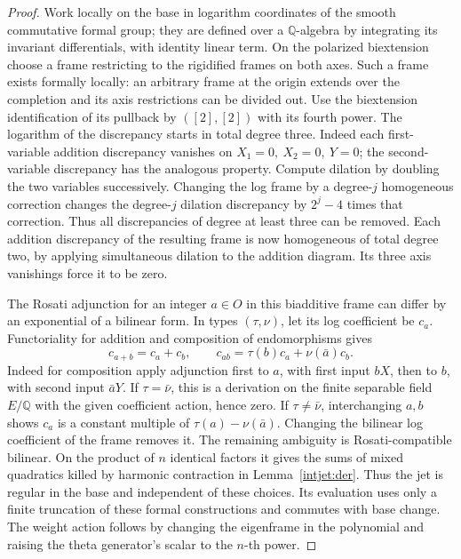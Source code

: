 \begin{proof}
Work locally on the base in logarithm coordinates of the smooth
commutative formal group; they are defined over a \(\mathbb Q\)-algebra
by integrating its invariant differentials, with identity linear term.
On the polarized biextension choose a frame restricting to the
rigidified frames on both axes. Such a frame exists formally
locally: an arbitrary frame at the origin extends over the
completion and its axis restrictions can be divided out.
Use the biextension identification of its pullback by
\(([2],[2])\) with its fourth power. The logarithm of the
discrepancy starts in total degree three. Indeed each first-variable
addition discrepancy vanishes on \(X_1=0,\ X_2=0,\ Y=0\);
the second-variable discrepancy has the analogous property.
Compute dilation by doubling the two variables successively.
Changing the log frame by a degree-\(j\) homogeneous correction
changes the degree-\(j\) dilation discrepancy by \(2^j-4\) times
that correction. Thus all discrepancies of degree at least three
can be removed. Each addition discrepancy of the resulting frame
is now homogeneous of total degree two, by applying simultaneous
dilation to the addition diagram. Its three axis vanishings force
it to be zero.

The Rosati adjunction for an integer \(a\in O\) in this biadditive
frame can differ by an exponential of a bilinear form. In
types \((\tau,\nu)\), let its log coefficient be \(c_a\).
Functoriality for addition and composition of endomorphisms gives
\[
 c_{a+b}=c_a+c_b,\qquad
 c_{ab}=\tau(b)c_a+\nu(\bar a)c_b .
\]
Indeed for composition apply adjunction first to \(a\), with
first input \(bX\), then to \(b\), with second input \(\bar aY\).
If \(\tau=\bar\nu\), this is a derivation on the finite separable
field \(E/\mathbb Q\) with the given coefficient action, hence
zero. If \(\tau\ne\bar\nu\), interchanging \(a,b\) shows
\(c_a\) is a constant multiple of \(\tau(a)-\nu(\bar a)\).
Changing the bilinear log coefficient of the frame removes it.
The remaining ambiguity is Rosati-compatible bilinear. On the
product of \(n\) identical factors it gives the sums of mixed
quadratics killed by harmonic contraction in
Lemma~\ref{intjet:der}. Thus the jet is regular in the base and
independent of these choices. Its evaluation uses only a finite
truncation of these formal constructions and commutes with base
change. The weight action follows by changing the eigenframe in
the polynomial and raising the theta generator's scalar to the
\(n\)-th power.


\end{proof}
